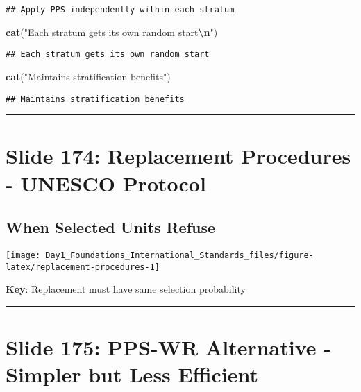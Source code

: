 \documentclass[
]{article}
\newenvironment{Shaded}{\begin{snugshade}}{\end{snugshade}}
\newcommand{\FunctionTok}[1]{\textcolor[rgb]{0.13,0.29,0.53}{\textbf{#1}}}
\newcommand{\NormalTok}[1]{#1}
\newcommand{\SpecialCharTok}[1]{\textcolor[rgb]{0.81,0.36,0.00}{\textbf{#1}}}
\newcommand{\StringTok}[1]{\textcolor[rgb]{0.31,0.60,0.02}{#1}}
\begin{document}
\begin{verbatim}
## Apply PPS independently within each stratum
\end{verbatim}

\begin{Shaded}
\begin{Highlighting}[]
\FunctionTok{cat}\NormalTok{(}\StringTok{"Each stratum gets its own random start}\SpecialCharTok{\textbackslash{}n}\StringTok{"}\NormalTok{)}
\end{Highlighting}
\end{Shaded}

\begin{verbatim}
## Each stratum gets its own random start
\end{verbatim}

\begin{Shaded}
\begin{Highlighting}[]
\FunctionTok{cat}\NormalTok{(}\StringTok{"Maintains stratification benefits"}\NormalTok{)}
\end{Highlighting}
\end{Shaded}

\begin{verbatim}
## Maintains stratification benefits
\end{verbatim}

\begin{center}\rule{0.5\linewidth}{0.5pt}\end{center}

\section{Slide 174: Replacement Procedures - UNESCO
Protocol}\label{slide-174-replacement-procedures---unesco-protocol}

\subsection{When Selected Units
Refuse}\label{when-selected-units-refuse}

\texttt{[image: Day1\_Foundations\_International\_Standards\_files/figure-latex/replacement-procedures-1]}

\textbf{Key}: Replacement must have same selection probability

\begin{center}\rule{0.5\linewidth}{0.5pt}\end{center}

\section{Slide 175: PPS-WR Alternative - Simpler but Less
Efficient}\label{slide-175-pps-wr-alternative---simpler-but-less-efficient}
\end{document}

